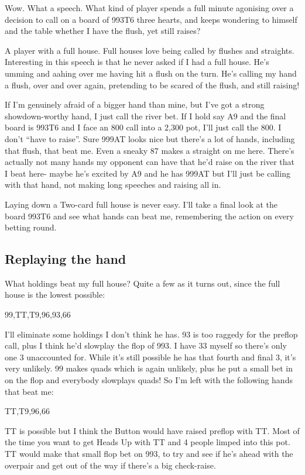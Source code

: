 Wow. What a speech. What kind of player spends a full minute agonising
over a decision to call on a board of 993T6 three hearts, and keeps
wondering to himself and the table whether I have the flush, yet still
raises?

A player with a full house. Full houses love being called by flushes
and straights. Interesting in this speech is that he never asked
if I had a full house. He's umming and aahing over me having
hit a flush on the turn. He's calling my hand a flush, over and over
again, pretending to be scared of the flush, and still raising!

If I'm genuinely afraid of a bigger hand than mine, but I've
got a strong showdown-worthy hand, I just call the river bet.
If I hold say A9 and the final board is 993T6 and I face an 800 call into
a 2,300 pot, I'll just call the 800. I don't ``have to raise''. Sure 999AT
looks nice but there's a lot of hands, including that flush, that beat me.
Even a sneaky 87 makes a straight on me here. There's actually not many
hands my opponent can have that he'd raise on the river that I beat here- maybe
he's excited by A9 and he has 999AT but I'll just be calling with that hand,
not making long speeches and raising all in.

Laying down a Two-card full house is never easy. I'll take a final look
at the board 993T6 and see what hands can beat me, remembering the
action on every betting round.

\subsection{Replaying the hand}

What holdings beat my full house? Quite a few as it turns out, since
the full house is the lowest possible:

99,TT,T9,96,93,66

I'll eliminate some holdings I don't think he has. 93 is too raggedy
for the preflop call, plus I think he'd slowplay the flop of 993.
I have 33 myself so there's only one 3 unaccounted for. While it's
still possible he has that fourth and final 3, it's very unlikely.
99 makes quads which is again unlikely, plus he put a small bet in
on the flop and everybody slowplays quads! So I'm left with the following
hands that beat me:

TT,T9,96,66

TT is possible but I think the Button would have raised preflop with TT.
Most of the time you want to get Heads Up with TT and 4 people limped
into this pot. TT would make that small flop bet on 993, to try and see
if he's ahead with the overpair and get out of the way if there's a big
check-raise.

